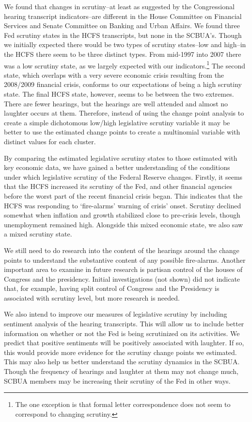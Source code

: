 \documentclass[a4paper]{article}\usepackage[]{graphicx}\usepackage[]{color}
\begin{document}
We found that changes in scrutiny--at least as suggested by the Congressional hearing transcript indicators--are different in the House Committee on Financial Services and Senate Committee on Banking and Urban Affairs. We found three Fed scrutiny states in the HCFS transcripts, but none in the SCBUA's. Though we initially expected there would be two types of scrutiny states--low and high--in the HCFS there seem to be three distinct types. From mid-1997 into 2007 there was a low scrutiny state, as we largely expected with our indicators.\footnote{The one exception is that formal letter correspondence does not seem to correspond to changing scrutiny.} The second state, which overlaps with a very severe economic crisis resulting from the 2008/2009 financial crisis, conforms to our expectations of being a high scrutiny state. The final HCFS state, however, seems to be between the two extremes. There are fewer hearings, but the hearings are well attended and almost no laughter occurs at them. Therefore, instead of using the change point analysis to create a simple dichotomous low/high legislative scrutiny variable it may be better to use the estimated change points to create a multinomial variable with distinct values for each cluster.

By comparing the estimated legislative scrutiny states to those estimated with key economic data, we have gained a better understanding of the conditions under which legislative scrutiny of the Federal Reserve changes. Firstly, it seems that the HCFS increased its scrutiny of the Fed, and other financial agencies before the worst part of the recent financial crisis began. This indicates that the HCFS was responding to `fire-alarms' warning of crisis' onset. Scrutiny declined somewhat when inflation and growth stabilized close to pre-crisis levels, though unemployment remained high. Alongside this mixed economic state, we also saw a mixed scrutiny state.

We still need to do research into the content of the hearings around the change points to understand the substantive content of any possible fire-alarms. Another important area to examine in future research is partisan control of the houses of Congress and the presidency. Initial investigations (not shown) did not indicate that, for example, having split control of Congress and the Presidency is associated with scrutiny level, but more research is needed.

We also intend to improve our measures of legislative scrutiny by including sentiment analysis of the hearing transcripts. This will allow us to include better information on whether or not the Fed is being scrutinized on its activities. We predict that positive sentiments will be positively associated with laughter. If so, this would provide more evidence for the scrutiny change points we estimated. This may also help us better understand the scrutiny dynamics in the SCBUA. Though the frequency of hearings and laughter at them may not change much, SCBUA members may be increasing their scrutiny of the Fed in other ways.
\end{document}

